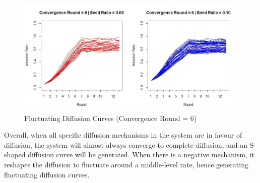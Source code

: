 \documentclass{bmcart}
\begin{document}
\begin{center}
\begin{figure}[ht]
\centering
\includegraphics[scale=0.35]{Fluctuating_curves_round_6_neg.jpg}
\caption{Fluctuating Diffusion Curves (Convergence Round = 6)}
\label{Fig: fluctuating curves round=6}
\end{figure}
\end{center}

Overall, when all specific diffusion mechanisms in the system are in favour of diffusion, the system will almost always converge to complete diffusion, and an S-shaped diffusion curve will be generated. When there is a negative mechanism, it reshapes the diffusion to fluctuate around a middle-level rate, hence generating fluctuating diffusion curves.
\end{document}

